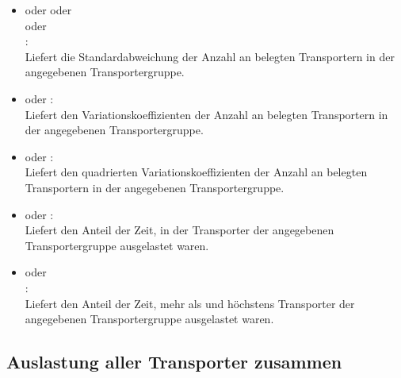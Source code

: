 \begin{itemize}
\item
{} oder  oder\\
 oder\\
:\\
Liefert die Standardabweichung der Anzahl an belegten Transportern in der angegebenen Transportergruppe.
  
\item
{} oder :\\
Liefert den Variationskoeffizienten der Anzahl an belegten Transportern in der angegebenen Transportergruppe.
  
\item
{} oder :\\
Liefert den quadrierten Variationskoeffizienten der Anzahl an belegten Transportern in der angegebenen Transportergruppe.
  
\item
{} oder :\\
Liefert den Anteil der Zeit, in der  Transporter der angegebenen Transportergruppe ausgelastet waren.
  
\item
{} oder\\
:\\
Liefert den Anteil der Zeit, mehr als  und höchstens  Transporter der angegebenen Transportergruppe ausgelastet waren.

\end{itemize}



\subsection{Auslastung aller Transporter zusammen}

